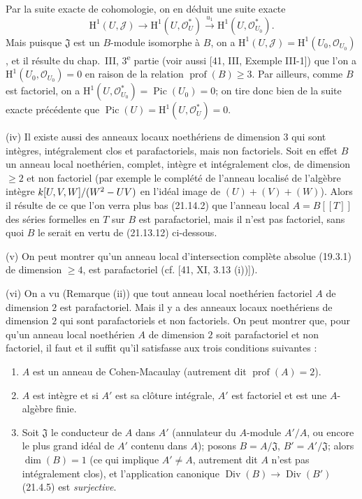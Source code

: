 \begin{examples}[21.13.9]
Par la suite exacte de cohomologie, on en déduit une suite exacte
\[
\label{IV.21.13.9.1}
  \mathrm H^1(U,\mathscr J)\longrightarrow\mathrm H^1(U,\mathcal O_U^*)
  \xrightarrow{u_1}\mathrm H^1(U,\mathcal O_{U_0}^*).
  \tag{21.13.9.1}
\]
Mais puisque $\mathfrak J$ est un $B$-module isomorphe à $B$, on a
$\mathrm H^1(U,\mathscr J)=\mathrm H^1(U_0,\mathcal O_{U_0})$, et il résulte du
chap.~III, 3\textsuperscript{e} partie (voir aussi [41, III, Exemple III-1]) que l'on a
$\mathrm H^1(U_0,\mathcal O_{U_0})=0$ en raison de la relation
$\operatorname{prof}(B)\geq3$. Par ailleurs, comme $B$ est factoriel, on a
$\mathrm H^1(U,\mathcal O_{U_0}^*)=\operatorname{Pic}(U_0)=0$; on tire donc bien de
la suite exacte précédente que
$\operatorname{Pic}(U)=\mathrm H^1(U,\mathcal O_U^*)=0$.

(iv) Il existe aussi des anneaux locaux noethériens de dimension $3$ qui sont
intègres, intégralement clos et parafactoriels, mais non factoriels. Soit en effet $B$
un anneau local noethérien, complet, intègre et intégralement clos, de dimension
$\geq2$ et non factoriel (par exemple le complété de l'anneau localisé de l'algèbre
intègre $k[U,V,W]/(W^2- UV)$ en l'idéal image de $(U)+(V)+(W)$). Alors il résulte de
ce que l'on verra plus bas (21.14.2) que l'anneau local $A=B[[T]]$ des séries formelles
en $T$ sur $B$ est parafactoriel, mais il n'est pas factoriel, sans quoi $B$ le serait
en vertu de (21.13.12) ci-dessous.

(v) On peut montrer qu'un anneau local d'intersection complète absolue (19.3.1) de
dimension $\geq4$, est parafactoriel (cf. [41, XI, 3.13 (i))]).

(vi) On a vu (Remarque (ii)) que tout anneau local noethérien factoriel $A$ de
dimension $2$ est parafactoriel. Mais il y a des anneaux locaux noethériens de
dimension $2$ qui sont parafactoriels et non factoriels. On peut montrer que, pour
qu'un anneau local noethérien $A$ de dimension $2$ soit parafactoriel et non
factoriel, il faut et il suffit qu'il satisfasse aux trois conditions suivantes :
\begin{enumerate}[label=\arabic*\textsuperscript{o}]
  \item $A$ est un anneau de Cohen-Macaulay (autrement dit
  $\operatorname{prof}(A)=2$).
  \item $A$ est intègre et si $A'$ est sa clôture intégrale, $A'$ est factoriel et est
  une $A$-algèbre finie.
  \item Soit $\mathfrak J$ le conducteur de $A$ dans $A'$ (annulateur du $A$-module
  $A'/A$, ou encore le plus grand idéal de $A'$ contenu dans $A$); posons
  $B=A/\mathfrak J$, $B'=A'/\mathfrak J$; alors $\dim(B)=1$ (ce qui implique
  $A'\neq A$, autrement dit $A$ n'est pas intégralement clos), et l'application
  canonique $\operatorname{Div}(B)\to\operatorname{Div}(B')$ (21.4.5) est
  \emph{surjective}.
\end{enumerate}


\end{examples}
